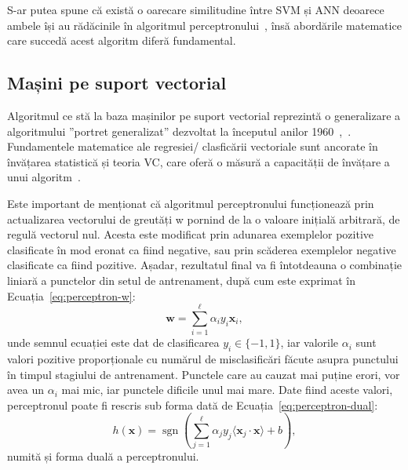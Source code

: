 S-ar putea spune că există o oarecare similitudine între SVM și ANN deoarece ambele își au rădăcinile în algoritmul perceptronului~\cite{rosenblatt1958perceptron}, însă abordările matematice care succedă acest algoritm diferă fundamental.

\subsection{Mașini pe suport vectorial}
\indent\par
Algoritmul ce stă la baza mașinilor pe suport vectorial reprezintă o generalizare a algoritmului ”portret generalizat” dezvoltat la începutul anilor 1960~\cite{vapnik1963pattern},~\cite{vapnik1964note}. Fundamentele matematice ale regresiei/ clasficării vectoriale sunt ancorate în învățarea statistică și teoria VC, care oferă o măsură a capacității de învățare a unui algoritm~\cite{vapnik2015uniform}.

Este important de menționat că algoritmul perceptronului funcționează prin actualizarea vectorului de greutăți w pornind de la o valoare inițială arbitrară, de regulă vectorul nul. Acesta este modificat prin adunarea exemplelor pozitive clasificate în mod eronat ca fiind negative, sau prin scăderea exemplelor negative clasificate ca fiind pozitive. Așadar, rezultatul final va fi întotdeauna o combinație liniară a punctelor din setul de antrenament, după cum este exprimat în Ecuația~\ref{eq:perceptron-w}:
\begin{equation}
  \mathbf{w} = \sum_{i=1}^{\ell} \alpha_i y_i \mathbf{x}_i,
  \label{eq:perceptron-w}
\end{equation}
unde semnul ecuației este dat de clasificarea $y_i \in \{-1, 1\}$, iar valorile $\alpha_i$ sunt valori pozitive proporționale cu numărul de misclasificări făcute asupra punctului în timpul stagiului de antrenament. Punctele care au cauzat mai puține erori, vor avea un $\alpha_i$ mai mic, iar punctele dificile unul mai mare. Date fiind aceste valori, perceptronul poate fi rescris sub forma dată de Ecuația~\ref{eq:perceptron-dual}:
\begin{equation}
  h(\mathbf{x}) = \operatorname{sgn} \left( \sum_{j=1}^{\ell} \alpha_j y_j \langle \mathbf{x}_j \cdot \mathbf{x} \rangle + b \right),
  \label{eq:perceptron-dual}
\end{equation}
numită și forma duală a perceptronului.

